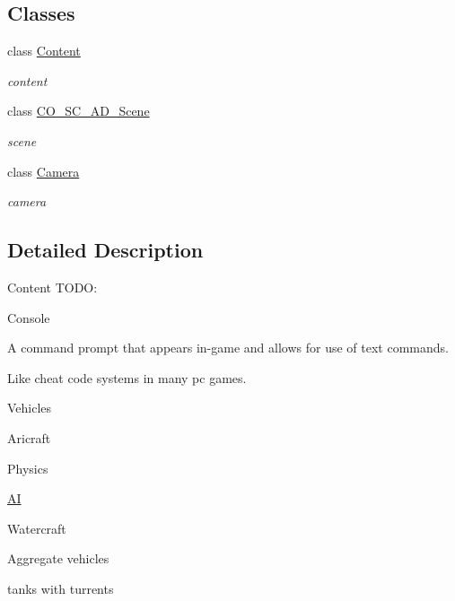 \subsection*{Classes}
\begin{DoxyCompactItemize}
\item 
class \hyperlink{classContent_1_1Content}{Content}
\begin{DoxyCompactList}\small\item\em content \item\end{DoxyCompactList}\item 
class \hyperlink{classContent_1_1CO__SC__AD__Scene}{CO\_\-SC\_\-AD\_\-Scene}
\begin{DoxyCompactList}\small\item\em scene \item\end{DoxyCompactList}\item 
class \hyperlink{classContent_1_1Camera}{Camera}
\begin{DoxyCompactList}\small\item\em camera \item\end{DoxyCompactList}\end{DoxyCompactItemize}


\subsection{Detailed Description}
Content TODO:
\begin{DoxyItemize}
\item Console
\begin{DoxyItemize}
\item A command prompt that appears in-\/game and allows for use of text commands.
\item Like cheat code systems in many pc games.
\end{DoxyItemize}
\item Vehicles
\begin{DoxyItemize}
\item Aricraft
\begin{DoxyItemize}
\item Physics
\item \hyperlink{namespaceContent_1_1AI}{AI}
\end{DoxyItemize}
\item Watercraft
\item Aggregate vehicles
\begin{DoxyItemize}
\item tanks with turrents 
\end{DoxyItemize}
\end{DoxyItemize}
\end{DoxyItemize}